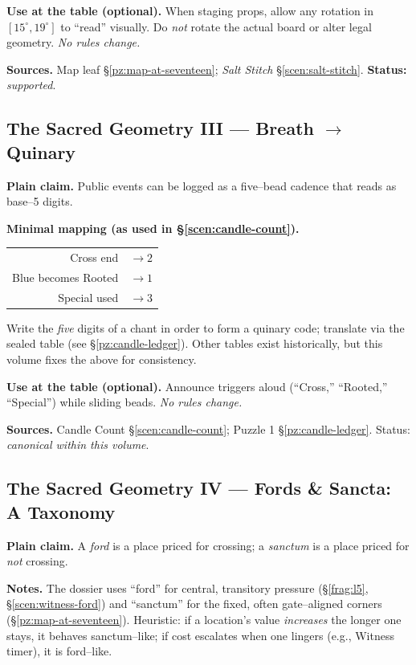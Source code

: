 \documentclass[11pt]{article}
\numberwithin{equation}{section} %
\theoremstyle{plain} %
\theoremstyle{definition} %
\theoremstyle{remark} %
\begin{document}
\medskip
\noindent\textbf{Use at the table (optional).} When staging props, allow any rotation in \([15^\circ,19^\circ]\) to “read” visually. Do \emph{not} rotate the actual board or alter legal geometry. \emph{No rules change.}

\medskip
\noindent\textbf{Sources.} Map leaf \S\ref{pz:map-at-seventeen}; \textit{Salt Stitch} \S\ref{scen:salt-stitch}. \textbf{Status:} \emph{supported}.

\subsection{The Sacred Geometry III — Breath $\rightarrow$ Quinary}
\label{geometry:breath-quinary}

\noindent\textbf{Plain claim.} Public events can be logged as a five–bead cadence that reads as base–5 digits.

\medskip
\noindent\textbf{Minimal mapping (as used in \S\ref{scen:candle-count}).}
\begin{center}
\begin{tabular}{rl}
Cross end & \(\rightarrow 2\) \\
Blue becomes Rooted & \(\rightarrow 1\) \\
Special used & \(\rightarrow 3\)
\end{tabular}
\end{center}
Write the \emph{five} digits of a chant in order to form a quinary code; translate via the sealed table (see \S\ref{pz:candle-ledger}). Other tables exist historically, but this volume fixes the above for consistency.

\medskip
\noindent\textbf{Use at the table (optional).} Announce triggers aloud (“Cross,” “Rooted,” “Special”) while sliding beads. \emph{No rules change.}

\medskip
\noindent\textbf{Sources.} Candle Count \S\ref{scen:candle-count}; Puzzle 1 \S\ref{pz:candle-ledger}. Status: \emph{canonical within this volume}.


\subsection{The Sacred Geometry IV — Fords \& Sancta: A Taxonomy}
\label{geometry:ford-vs-sanctum}

\noindent\textbf{Plain claim.} A \emph{ford} is a place priced for crossing; a \emph{sanctum} is a place priced for \emph{not} crossing.

\medskip
\noindent\textbf{Notes.} The dossier uses “ford” for central, transitory pressure (\S\ref{frag:l5}, \S\ref{scen:witness-ford}) and “sanctum” for the fixed, often gate–aligned corners (\S\ref{pz:map-at-seventeen}). Heuristic: if a location’s value \emph{increases} the longer one stays, it behaves sanctum–like; if cost escalates when one lingers (e.g., Witness timer), it is ford–like.
\end{document}
